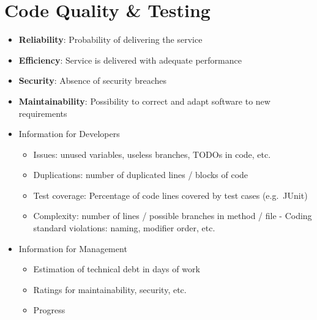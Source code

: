 \section{Code Quality \& Testing}

\begin{breakbox}
\begin{itemize}
    \item \textbf{Reliability}: Probability of delivering the service
    \item \textbf{Efficiency}: Service is delivered with adequate performance
    \item \textbf{Security}: Absence of security breaches
    \item \textbf{Maintainability}: Possibility to correct and adapt software to new requirements
\end{itemize}
\end{breakbox}

\begin{breakbox}

\begin{itemize}
    \item Information for Developers
    \begin{itemize}
        \item Issues: unused variables, useless branches, TODOs in code, etc.
        \item Duplications: number of duplicated lines / blocks of code
        \item Test coverage: Percentage of code lines covered by test cases (e.g.~JUnit)
        \item Complexity: number of lines / possible branches in method / file - Coding standard violations: naming, modifier order, etc.
    \end{itemize}
    \item Information for Management
    \begin{itemize}
        \item Estimation of technical debt in days of work
        \item Ratings for maintainability, security, etc.
        \item Progress
    \end{itemize}
\end{itemize}
\end{breakbox}